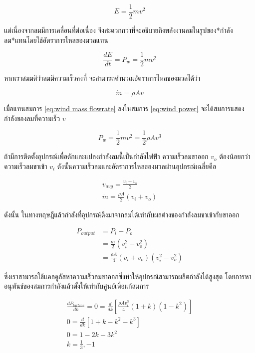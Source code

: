 \documentclass[a4paper,nobib,openany]{tufte-book}
\begin{document}
\[E = \frac{1}{2} mv^2\]

แต่เนื่องจากลมมีการเคลื่อนที่ต่อเนื่อง
จึงสะดวกกว่าที่จะอธิบายถึงพลังงานลมในรูปของ*กำลังลม*แทนโดยใช้อัตราการไหลของมวลแทน

\begin{equation}
\label{eq:wind power}
  \frac{dE}{dt} = P_w = \frac{1}{2} \dot{m} v^2
\end{equation}

หากเราสมมติว่าลมมีความเร็วคงที่ จะสามารถคำนวณอัตราการไหลของมวลได้ว่า

\begin{equation}
\label{eq:wind mass flowrate}
  \dot{m} = \rho A v
\end{equation}

เมื่อแทนสมการ \ref{eq:wind mass flowrate} ลงในสมการ \ref{eq:wind power} จะได้สมการแสดงกำลังของลมที่ความเร็ว \(v\)

\[P_w = \frac{1}{2} \dot{m} v^2 = \frac{1}{2} \rho A v^3\]

ถ้ามีการติดตั้งอุปกรณ์เพื่อดักและแปลงกำลังลมนี้เป็นกำลังไฟฟ้า
ความเร็วลมขาออก \(v_o\) ต้องน้อยกว่าความเร็วลมขาเข้า \(v_i\)
ดังนั้นความเร็วลมและอัตราการไหลของมวลผ่านอุปกรณ์เฉลี่ยคือ

\[\begin{gathered}
  v_{avg} = \frac{v_i + v_o}{2} \\
  \dot{m} = \frac{\rho A}{2} \left( v_i + v_o \right)
  \end{gathered}\]

ดังนั้น
ในทางทฤษฎีแล้วกำลังที่อุปกรณ์ดึงมาจากลมได้เท่ากับผลต่างของกำลังลมขาเข้ากับขาออก

\[\begin{aligned}
  P_{output} &= P_{i} - P_{o} \\
             &= \frac{\dot{m}}{2} \left( v_i^2 - v_o^2 \right) \\
             &= \frac{\rho A}{4} \left( v_i + v_o \right)\left( v_i^2 - v_o^2 \right)\end{aligned}\]

ซึ่งเราสามารถใช้แคลคูลัสหาความเร็วลมขาออกซึ่งทำให้อุปกรณ์สามารถผลิตกำลังได้สูงสุด
โดยการหาอนุพันธ์ของสมการกำลังแล้วตั้งให้เท่ากับศูนย์เพื่อแก้สมการ

\[\begin{gathered}
  \frac{dP_{turbine}}{dk} = 0 = \frac{d}{dk} \left[ \frac{\rho A v_i^3}{4} \left( 1 + k \right) \left( 1 - k^2 \right) \right] \nonumber \\
  0 = \frac{d}{dk} \left[ 1 + k - k^2 - k^3 \right] \nonumber \\
  0 = 1 - 2k - 3k^2 \nonumber \\
  k = \frac{1}{3}, -1\end{gathered}\]
\end{document}
